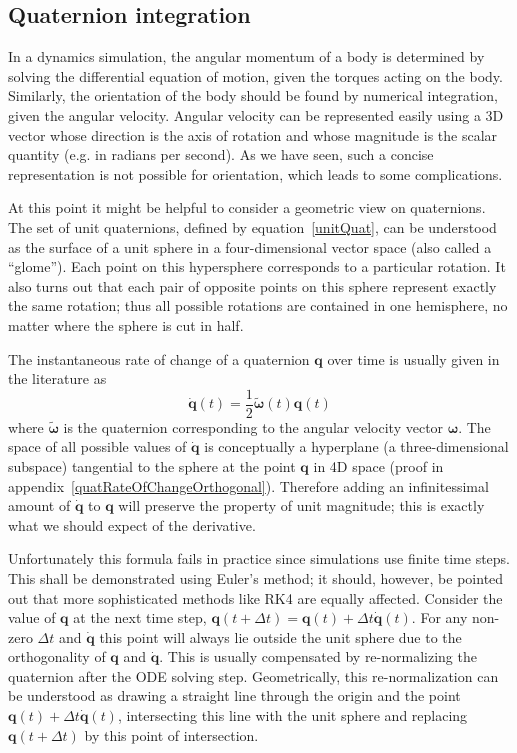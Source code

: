 \subsection{Quaternion integration}

In a dynamics simulation, the angular momentum of a body is determined by solving the
differential equation of motion, given the torques acting on the body. Similarly, the
orientation of the body should be found by numerical integration, given the angular
velocity. Angular velocity can be represented easily using a 3D vector whose
direction is the axis of rotation and whose magnitude is the scalar quantity (e.g. in
radians per second). As we have seen, such a concise representation is not possible for
orientation, which leads to some complications.

At this point it might be helpful to consider a geometric view on quaternions. The set of
unit quaternions, defined by equation~\ref{unitQuat}, can be understood as the surface of
a unit sphere in a four-dimensional vector space (also called a ``glome''\cite{MathWorld:4D}).
Each point on this hypersphere corresponds to a particular rotation. It also turns out that each pair of
opposite points on this sphere represent exactly the same rotation; thus all possible
rotations are contained in one hemisphere, no matter where the sphere is cut in half.

The instantaneous rate of change of a quaternion $\mathbf{q}$ over time is usually given
in the literature as
\begin{equation}
\label{quatRateOfChange}
\dot{\mathbf{q}}(t) = \frac{1}{2}\tilde{\bm{\omega}}(t)\mathbf{q}(t)
\end{equation}
where $\tilde{\bm{\omega}}$ is the quaternion corresponding to the angular velocity
vector $\bm{\omega}$. The space of all possible values of $\dot{\mathbf{q}}$ is
conceptually a hyperplane (a three-dimensional subspace) tangential to the sphere at the point
$\mathbf{q}$ in 4D space (proof in appendix~\ref{quatRateOfChangeOrthogonal}). Therefore adding an
infinitessimal amount of $\dot{\mathbf{q}}$ to $\mathbf{q}$ will preserve the property of
unit magnitude; this is exactly what we should expect of the derivative.

Unfortunately this formula fails in practice since simulations use finite time steps. This
shall be demonstrated using Euler's method; it should, however, be pointed out that more
sophisticated methods like RK4 are equally affected. Consider the value of $\mathbf{q}$ at
the next time step, $\mathbf{q}(t + \Delta t) = \mathbf{q}(t) + \Delta t \dot{\mathbf{q}}(t)$.
For any non-zero $\Delta t$ and $\dot{\mathbf{q}}$ this point will always lie outside the
unit sphere due to the orthogonality of $\mathbf{q}$ and $\dot{\mathbf{q}}$.
This is usually compensated by re-normalizing the quaternion after the ODE solving step.
Geometrically, this re-normalization can be understood as drawing a straight line through
the origin and the point $\mathbf{q}(t) + \Delta t \dot{\mathbf{q}}(t)$,
intersecting this line with the unit sphere and replacing $\mathbf{q}(t + \Delta t)$ by this
point of intersection.

